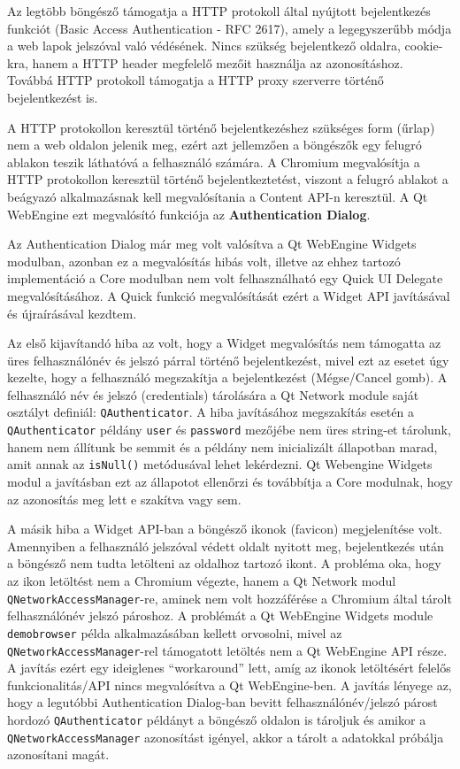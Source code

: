 \documentclass[12pt]{report}
\begin{document}
\noindent
Az legtöbb böngésző támogatja a HTTP protokoll által nyújtott bejelentkezés funkciót
(Basic Access Authentication - RFC 2617), amely a legegyszerűbb módja a web lapok jelszóval
való védésének. Nincs szükség bejelentkező oldalra, cookie-kra, hanem a HTTP header
megfelelő mezőit használja az azonosításhoz. Továbbá HTTP protokoll támogatja a HTTP proxy
szerverre történő bejelentkezést is.

A HTTP protokollon keresztül történő bejelentkezéshez szükséges form (űrlap) nem a web
oldalon jelenik meg, ezért azt jellemzően a böngészők egy felugró ablakon teszik láthatóvá
a felhasználó számára. A Chromium megvalósítja a HTTP protokollon keresztül történő
bejelentkeztetést, viszont a felugró ablakot a beágyazó alkalmazásnak kell megvalósítania
a Content API-n keresztül. A Qt WebEngine ezt megvalósító funkciója az
\textbf{Authentication Dialog}.

Az Authentication Dialog már meg volt valósítva a Qt WebEngine Widgets modulban, azonban
ez a megvalósítás hibás volt, illetve az ehhez tartozó implementáció a Core modulban nem
volt felhasználható egy Quick UI Delegate megvalósításához. A Quick funkció megvalósítását
ezért a Widget API javításával és újraírásával kezdtem.

Az első kijavítandó hiba az volt, hogy a Widget megvalósítás nem támogatta az üres
felhasználónév és jelszó párral történő bejelentkezést, mivel ezt az esetet úgy kezelte,
hogy a felhasználó megszakítja a bejelentkezést (Mégse/Cancel gomb). A felhasználó név
és jelszó (credentials) tárolására a Qt Network module saját osztályt definiál:
\texttt{QAuthenticator}. A hiba javításához megszakítás esetén a \texttt{QAuthenticator}
példány \texttt{user} és \texttt{password} mezőjébe nem üres string-et tárolunk, hanem
nem állítunk be semmit és a példány nem inicializált állapotban marad, amit annak az
\texttt{isNull()} metódusával lehet lekérdezni. Qt Webengine Widgets modul a javításban
ezt az állapotot ellenőrzi és továbbítja a Core modulnak, hogy az azonosítás meg lett e
szakítva vagy sem.

A másik hiba a Widget API-ban a böngésző ikonok (favicon) megjelenítése volt. Amennyiben a
felhasználó jelszóval védett oldalt nyitott meg, bejelentkezés után a böngésző nem tudta
letölteni az oldalhoz tartozó ikont. A probléma oka, hogy az ikon letöltést nem a Chromium
végezte, hanem a Qt Network modul \texttt{QNetworkAccessManager}-re, aminek nem volt
hozzáférése a Chromium által tárolt felhasználónév jelszó pároshoz. A problémát a
Qt WebEngine Widgets module \texttt{demobrowser} példa alkalmazásában kellett orvosolni,
mivel az \texttt{QNetworkAccessManager}-rel támogatott letöltés nem a Qt WebEngine API része.
A javítás ezért egy ideiglenes ``workaround'' lett, amíg az ikonok letöltésért felelős
funkcionalitás/API nincs megvalósítva a Qt WebEngine-ben. A javítás lényege az, hogy a
legutóbbi Authentication Dialog-ban bevitt felhasználónév/jelszó párost hordozó
\texttt{QAuthenticator} példányt a böngésző oldalon is tároljuk és amikor a
\texttt{QNetworkAccessManager} azonosítást igényel, akkor a tárolt a adatokkal próbálja
azonosítani magát.
\end{document}
